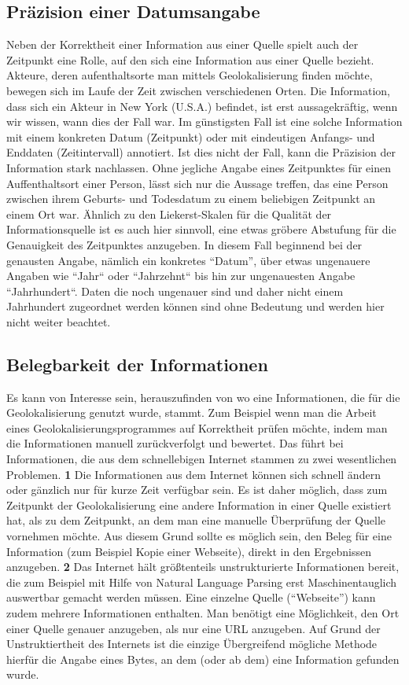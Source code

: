 \subsection{Präzision einer Datumsangabe}
Neben der Korrektheit einer Information aus einer Quelle spielt auch der Zeitpunkt eine Rolle, auf den sich eine Information aus einer Quelle bezieht. Akteure, deren aufenthaltsorte man mittels Geolokalisierung finden möchte, bewegen sich im Laufe der Zeit zwischen verschiedenen Orten. Die Information, dass sich ein Akteur in New York (U.S.A.) befindet, ist erst aussagekräftig, wenn wir wissen, wann dies der Fall war. Im günstigsten Fall ist eine solche Information mit einem konkreten Datum (Zeitpunkt) oder mit eindeutigen Anfangs- und Enddaten (Zeitintervall) annotiert. Ist dies nicht der Fall, kann die Präzision der Information stark nachlassen. Ohne jegliche Angabe eines Zeitpunktes für einen Auffenthaltsort einer Person, lässt sich nur die Aussage treffen, das eine Person zwischen ihrem Geburts- und Todesdatum zu einem beliebigen Zeitpunkt an einem Ort war. Ähnlich zu den Liekerst-Skalen für die Qualität der Informationsquelle ist es auch hier sinnvoll, eine etwas gröbere Abstufung für die Genauigkeit des Zeitpunktes anzugeben. In diesem Fall beginnend bei der genausten Angabe, nämlich ein konkretes ``Datum'', über etwas ungenauere Angaben wie ``Jahr`` oder ``Jahrzehnt`` bis hin zur ungenauesten Angabe ``Jahrhundert``. Daten die noch ungenauer sind und daher nicht einem Jahrhundert zugeordnet werden können sind ohne Bedeutung und werden hier nicht weiter beachtet.

\subsection{Belegbarkeit der Informationen}
Es kann von Interesse sein, herauszufinden von wo eine Informationen, die für die Geolokalisierung genutzt wurde, stammt. Zum Beispiel wenn man die Arbeit eines Geolokalisierungsprogrammes auf Korrektheit prüfen möchte, indem man die Informationen manuell zurückverfolgt und bewertet. Das führt bei Informationen, die aus dem schnellebigen Internet stammen zu zwei wesentlichen Problemen. \textbf{1} Die Informationen aus dem Internet können sich schnell ändern oder gänzlich nur für kurze Zeit verfügbar sein. Es ist daher möglich, dass zum Zeitpunkt der Geolokalisierung eine andere Information in einer Quelle existiert hat, als zu dem Zeitpunkt, an dem man eine manuelle Überprüfung der Quelle vornehmen möchte. Aus diesem Grund sollte es möglich sein, den Beleg für eine Information (zum Beispiel Kopie einer Webseite), direkt in den Ergebnissen  anzugeben. \textbf{2} Das Internet hält größtenteils unstrukturierte Informationen bereit, die zum Beispiel mit Hilfe von Natural Language Parsing erst Maschinentauglich auswertbar gemacht werden müssen. Eine einzelne Quelle (``Webseite'') kann zudem mehrere Informationen enthalten. Man benötigt eine Möglichkeit, den Ort einer Quelle genauer anzugeben, als nur eine URL anzugeben. Auf Grund der Unstruktiertheit des Internets ist die einzige Übergreifend mögliche Methode hierfür die Angabe eines Bytes, an dem (oder ab dem) eine Information gefunden wurde.

